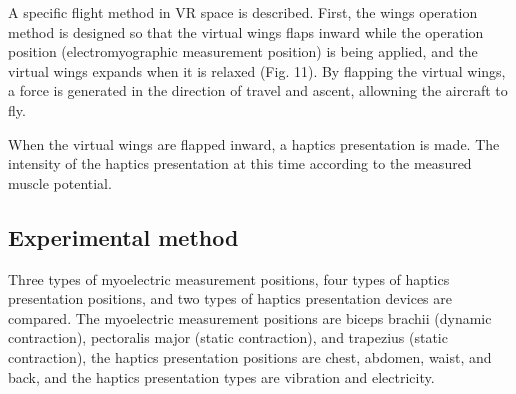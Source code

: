 \documentclass[letterpaper, 10 pt, conference]{ieeeconf}  %
\begin{document}
                
                A specific flight method in VR space is described.  
                First, the wings operation method is designed so that the virtual wings flaps inward while the operation position (electromyographic measurement position) is being applied, and the virtual wings expands when it is relaxed (Fig. 11).  
                By flapping the virtual wings, a force 
                is generated in the direction of travel and ascent, allowning the aircraft to fly.  

                When the virtual wings are flapped inward, a haptics presentation is made.  
                The intensity of the haptics presentation at this time 
                according to the measured muscle potential.  

        
        \subsection{Experimental method}
                Three types of myoelectric measurement positions, four types of haptics presentation positions, and two types of haptics presentation devices are compared.  
                The myoelectric measurement positions are biceps brachii (dynamic contraction), pectoralis major (static contraction), and trapezius (static contraction), the haptics presentation positions are chest, abdomen, waist, and back, and the haptics presentation types are vibration and electricity.
                
\end{document}
